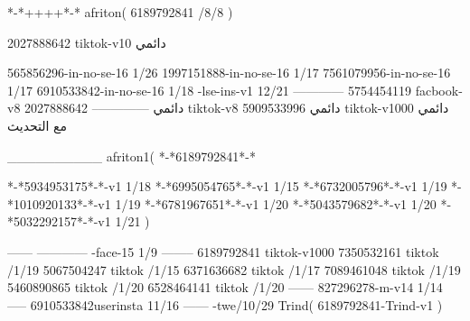 *-*++++*-*
afriton(
6189792841 /8/8
)

2027888642 tiktok-v10
دائمي

565856296-in-no-se-16 1/26
1997151888-in-no-se-16 1/17
7561079956-in-no-se-16 1/17
6910533842-in-no-se-16 1/18
-lse-ins-v1 12/21
------------
5754454119 facbook-v8
دائمي
--------------
2027888642 tiktok-v8
دائمي
5909533996 tiktok-v1000
دائمي مع التحديث

__________
afriton1(
*-*6189792841*-*


*-*5934953175*-*-v1 1/18
*-*6995054765*-*-v1 1/15
*-*6732005796*-*-v1 1/19
*-*1010920133*-*-v1 1/19
*-*6781967651*-*-v1 1/20
*-*5043579682*-*-v1 1/20
*-*5032292157*-*-v1 1/21
)

------
------------
-face-15 1/9
--------
6189792841 tiktok-v1000
7350532161 tiktok /1/19
5067504247 tiktok /1/15
6371636682 tiktok /1/17
7089461048 tiktok /1/19
5460890865 tiktok /1/20
6528464141 tiktok /1/20
------
827296278-m-v14 1/14
-----
6910533842userinsta 11/16
------
-twe/10/29
Trind(
6189792841-Trind-v1 
)

